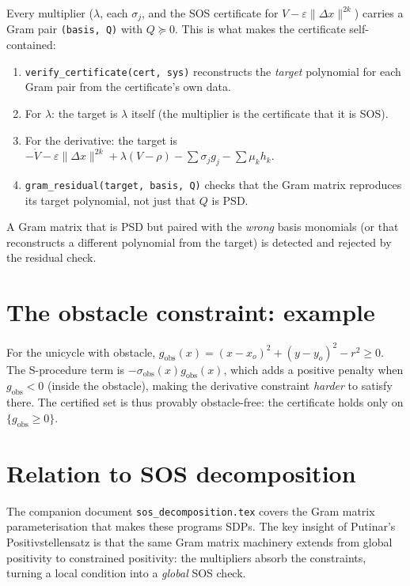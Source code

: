 \documentclass[11pt]{article}
\begin{document}
Every multiplier ($\lambda$, each $\sigma_j$, and the SOS certificate
for $V - \varepsilon\|\Delta x\|^{2k}$) carries a Gram pair
\texttt{(basis, Q)} with $Q \succeq 0$. This is what makes the certificate
self-contained:
\begin{enumerate}
  \item \texttt{verify\_certificate(cert, sys)} reconstructs the \emph{target}
    polynomial for each Gram pair from the certificate's own data.
  \item For $\lambda$: the target is $\lambda$ itself (the multiplier
    is the certificate that it is SOS).
  \item For the derivative: the target is
    $-\dot{V} - \varepsilon\|\Delta x\|^{2k} + \lambda(V - \rho)
     - \sum \sigma_j g_j - \sum \mu_k h_k$.
  \item \texttt{gram\_residual(target, basis, Q)} checks that the
    Gram matrix reproduces its target polynomial, not just that $Q$ is PSD.
\end{enumerate}

A Gram matrix that is PSD but paired with the \emph{wrong} basis monomials
(or that reconstructs a different polynomial from the target) is detected
and rejected by the residual check.

\section{The obstacle constraint: example}

For the unicycle with obstacle, $g_{\mathrm{obs}}(x) = (x - x_o)^2 +
(y - y_o)^2 - r^2 \ge 0$. The S-procedure term is
$-\sigma_{\mathrm{obs}}(x) g_{\mathrm{obs}}(x)$, which adds a positive
penalty when $g_{\mathrm{obs}} < 0$ (inside the obstacle), making the
derivative constraint \emph{harder} to satisfy there. The certified set
is thus provably obstacle-free: the certificate holds only on
$\{g_{\mathrm{obs}} \ge 0\}$.

\section{Relation to SOS decomposition}

The companion document \texttt{sos\_decomposition.tex} covers the Gram matrix
parameterisation that makes these programs SDPs. The key insight of
Putinar's Positivstellensatz is that the same Gram matrix machinery extends
from global positivity to constrained positivity: the multipliers absorb
the constraints, turning a local condition into a \emph{global} SOS check.
\end{document}
